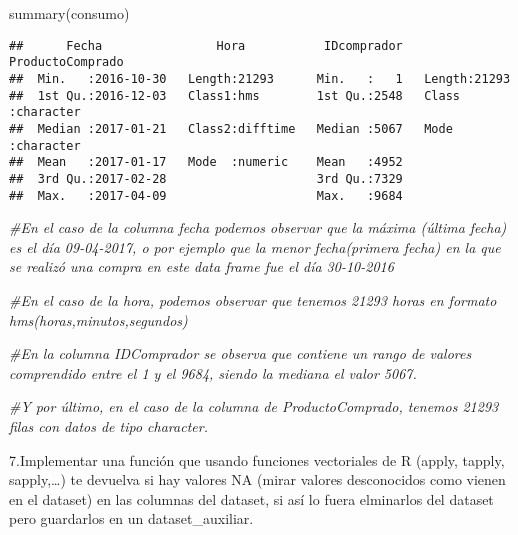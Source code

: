 \documentclass[
]{book}
\newenvironment{Shaded}{\begin{snugshade}}{\end{snugshade}}
\newcommand{\CommentTok}[1]{\textcolor[rgb]{0.56,0.35,0.01}{\textit{#1}}}
\newcommand{\FunctionTok}[1]{\textcolor[rgb]{0.00,0.00,0.00}{#1}}
\newcommand{\NormalTok}[1]{#1}
\begin{document}
\begin{Shaded}
\begin{Highlighting}[]
\FunctionTok{summary}\NormalTok{(consumo)}
\end{Highlighting}
\end{Shaded}

\begin{verbatim}
##      Fecha                Hora           IDcomprador   ProductoComprado  
##  Min.   :2016-10-30   Length:21293      Min.   :   1   Length:21293      
##  1st Qu.:2016-12-03   Class1:hms        1st Qu.:2548   Class :character  
##  Median :2017-01-21   Class2:difftime   Median :5067   Mode  :character  
##  Mean   :2017-01-17   Mode  :numeric    Mean   :4952                     
##  3rd Qu.:2017-02-28                     3rd Qu.:7329                     
##  Max.   :2017-04-09                     Max.   :9684
\end{verbatim}

\begin{Shaded}
\begin{Highlighting}[]
\CommentTok{\#En el caso de la columna fecha podemos observar que la máxima (última fecha) es el día 09{-}04{-}2017, o por ejemplo que la menor fecha(primera fecha) en la que se realizó una compra en este data frame fue el día 30{-}10{-}2016}

\CommentTok{\#En el caso de la hora, podemos observar que tenemos 21293 horas en formato hms(horas,minutos,segundos)}

\CommentTok{\#En la columna IDComprador se observa que contiene un rango de valores comprendido entre el 1 y el 9684, siendo la mediana el valor 5067.}

\CommentTok{\#Y por último, en el caso de la columna de ProductoComprado, tenemos 21293 filas con datos de tipo character.}
\end{Highlighting}
\end{Shaded}

7.Implementar una función que usando funciones vectoriales de R (apply, tapply, sapply,\ldots) te devuelva si hay valores NA (mirar valores desconocidos como vienen en el dataset) en las columnas del dataset, si así lo fuera elminarlos del dataset pero guardarlos en un dataset\_auxiliar.
\end{document}
